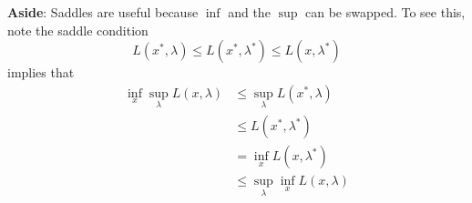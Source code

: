 \textbf{Aside}: Saddles are useful because $\inf$ and the $\sup$ can
be swapped. To see this, note the saddle condition
\[L(x^*, \lambda) \leq L(x^*, \lambda^*) \leq L(x, \lambda^*)\]
implies that
\begin{align}
\inf_x \sup_\lambda L(x,\lambda)
&\leq \sup_\lambda L(x^*, \lambda)\\
&\leq L(x^*, \lambda^*) \\
&= \inf_x L(x, \lambda^*) \\
&\leq \sup_\lambda \inf_x L(x,\lambda)
\end{align}
